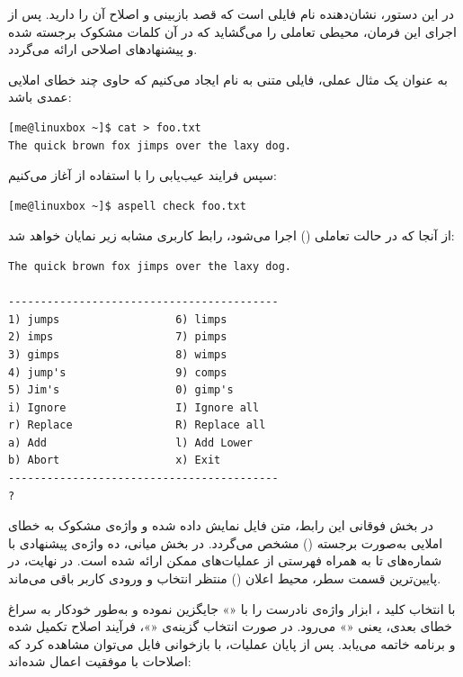 در این دستور،  نشان‌دهنده نام فایلی است که قصد بازبینی و اصلاح آن را دارید. پس از اجرای این فرمان،  محیطی تعاملی را می‌گشاید که در آن کلمات مشکوک برجسته شده و پیشنهادهای اصلاحی ارائه می‌گردد.

به عنوان یک مثال عملی، فایلی متنی به نام  ایجاد می‌کنیم که حاوی چند خطای املایی عمدی باشد:

\begin{latin}
\begin{lstlisting}
[me@linuxbox ~]$ cat > foo.txt
The quick brown fox jimps over the laxy dog.
\end{lstlisting}
\end{latin}

سپس فرایند عیب‌یابی را با استفاده از  آغاز می‌کنیم:

\begin{latin}
\begin{lstlisting}
[me@linuxbox ~]$ aspell check foo.txt
\end{lstlisting}
\end{latin}

از آنجا که  در حالت تعاملی () اجرا می‌شود، رابط کاربری مشابه زیر نمایان خواهد شد:

\begin{latin}
\begin{lstlisting}
The quick brown fox jimps over the laxy dog.

------------------------------------------
1) jumps                  6) limps
2) imps                   7) pimps
3) gimps                  8) wimps
4) jump's                 9) comps
5) Jim's                  0) gimp's
i) Ignore                 I) Ignore all
r) Replace                R) Replace all
a) Add                    l) Add Lower
b) Abort                  x) Exit
------------------------------------------
?
\end{lstlisting}
\end{latin}

در بخش فوقانی این رابط، متن فایل نمایش داده شده و واژه‌ی مشکوک به خطای املایی به‌صورت برجسته () مشخص می‌گردد. در بخش میانی، ده واژه‌ی پیشنهادی با شماره‌های  تا  به همراه فهرستی از عملیات‌های ممکن ارائه شده است. در نهایت، در پایین‌ترین قسمت سطر، محیط اعلان () منتظر انتخاب و ورودی کاربر باقی می‌ماند.

با انتخاب کلید ، ابزار  واژه‌ی نادرست را با «» جایگزین نموده و به‌طور خودکار به سراغ خطای بعدی، یعنی «» می‌رود. در صورت انتخاب گزینه‌ی «»، فرآیند اصلاح تکمیل شده و برنامه خاتمه می‌یابد. پس از پایان عملیات، با بازخوانی فایل می‌توان مشاهده کرد که اصلاحات با موفقیت اعمال شده‌اند:

